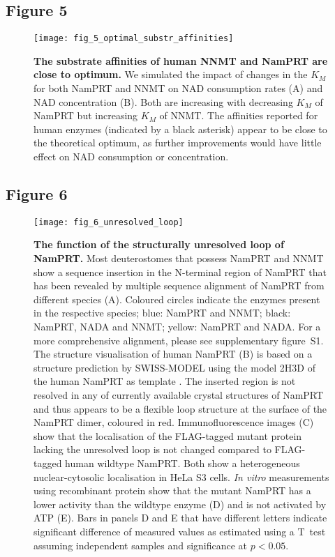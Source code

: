 \newpage


\subsection*{Figure 5}

\begin{figure}[ht]
  \centering
  \texttt{[image: fig\_5\_optimal\_substr\_affinities]}
  \caption{\textbf{The substrate affinities of human NNMT and NamPRT are close to optimum.} We simulated the impact of changes in the $K_{M}$ for both NamPRT and NNMT on NAD consumption rates (A) and NAD concentration (B). Both are increasing with decreasing $K_{M}$ of NamPRT but increasing $K_{M}$ of NNMT. The affinities reported for human enzymes (indicated by a black asterisk) appear to be close to the theoretical optimum, as further improvements would have little effect on NAD consumption or concentration.}
  \label{fig:optimal_substr_affinities}
\end{figure}

\newpage


\subsection*{Figure 6}

\begin{figure}[ht]
  \centering
  \texttt{[image: fig\_6\_unresolved\_loop]}
  \caption{\textbf{The function of the structurally unresolved loop of NamPRT.} Most deuterostomes that possess NamPRT and NNMT show a sequence insertion in the N-terminal region of NamPRT that has been revealed by multiple sequence alignment of NamPRT from different species (A). Coloured circles indicate the enzymes present in the respective species; blue: NamPRT and NNMT; black: NamPRT, NADA and NNMT; yellow: NamPRT and NADA. For a more comprehensive alignment, please see supplementary figure~S1. The structure visualisation of human NamPRT (B) is based on a structure prediction by SWISS-MODEL \cite{Arnold2006,Biasini2014} using the model 2H3D of the human NamPRT as template \cite{Wang2006}. The inserted region is not resolved in any of currently available crystal structures of NamPRT and thus appears to be a flexible loop structure at the surface of the NamPRT dimer, coloured in red. Immunofluorescence images (C) show that the localisation of the FLAG-tagged mutant protein lacking the unresolved loop is not changed compared to FLAG-tagged human wildtype NamPRT. Both show a heterogeneous nuclear-cytosolic localisation in HeLa S3 cells. \textit{In vitro} measurements using recombinant protein show that the mutant NamPRT has a lower activity than the wildtype enzyme (D) and is not activated by ATP (E). Bars in panels D and E that have different letters indicate significant difference of measured values as estimated using a T~test assuming independent samples and significance at $p < 0.05$.}
  \label{fig:unresolved_loop}
\end{figure}

